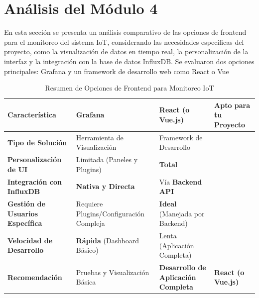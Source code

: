 \section{Análisis del Módulo 4}
En esta sección se presenta un análisis comparativo de las opciones de frontend para el monitoreo del sistema IoT, considerando las necesidades específicas del proyecto, como la visualización de datos en tiempo real, la personalización de la interfaz y la integración con la base de datos InfluxDB.
Se evaluaron dos opciones principales: Grafana y un framework de desarrollo web como React o Vue
\begin{table}[h]
    \centering
    \caption{Resumen de Opciones de Frontend para Monitoreo IoT}
    \label{tab:frontend_resumen}
    \begin{tabular}{|l|l|l|l|}
        \hline
        \textbf{Característica} & \textbf{Grafana}  & \textbf{React (o Vue.js)}  & \textbf{Apto para tu Proyecto} \\
        \hline
        \textbf{Tipo de Solución} & Herramienta de Visualización & Framework de Desarrollo & \\
        \hline
        \textbf{Personalización de UI} & Limitada (Paneles y Plugins) & \textbf{Total} & \multicolumn{1}{l|}{} \\
        \hline
        \textbf{Integración con InfluxDB} & \textbf{Nativa y Directa} & Vía \textbf{Backend API} & \multicolumn{1}{l|}{} \\
        \hline
        \textbf{Gestión de Usuarios Específica} & Requiere Plugins/Configuración Compleja & \textbf{Ideal} (Manejada por Backend) & \multicolumn{1}{l|}{} \\
        \hline
        \textbf{Velocidad de Desarrollo} & \textbf{Rápida} (Dashboard Básico) & Lenta (Aplicación Completa) & \multicolumn{1}{l|}{} \\
        \hline
        \textbf{Recomendación} & Pruebas y Visualización Básica & \textbf{Desarrollo de Aplicación Completa} & \textbf{React (o Vue.js)} \\
        \hline
    \end{tabular}
\end{table}
